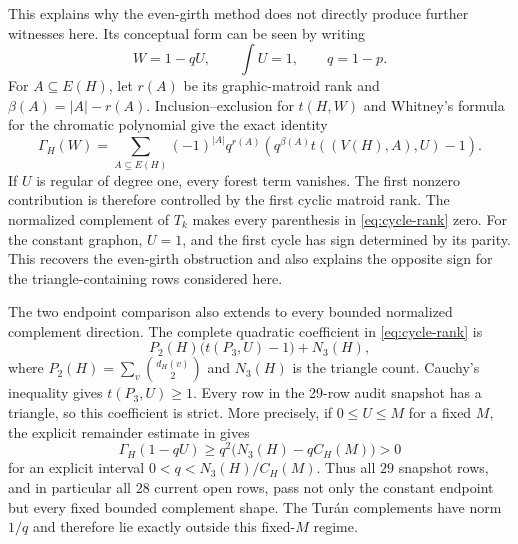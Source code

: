 \documentclass[11pt]{article}
\begin{document}
This explains why the even-girth method does not directly produce further
witnesses here.  Its conceptual form can be seen by writing
\[
 W=1-qU,
 \qquad
 \int U=1,
 \qquad q=1-p.
\]
For $A\subseteq E(H)$, let $r(A)$ be its graphic-matroid rank and
$\beta(A)=|A|-r(A)$.  Inclusion--exclusion for $t(H,W)$ and Whitney's
formula for the chromatic polynomial give the exact identity
\begin{equation}
 \Gamma_H(W)
 =\sum_{A\subseteq E(H)}(-1)^{|A|}q^{r(A)}
 \left(q^{\beta(A)}t((V(H),A),U)-1\right).
 \label{eq:cycle-rank}
\end{equation}
If $U$ is regular of degree one, every forest term vanishes.  The first
nonzero contribution is therefore controlled by the first cyclic matroid
rank.  The normalized complement of $T_k$ makes every parenthesis in
\eqref{eq:cycle-rank} zero.  For the constant graphon, $U=1$, and the first
cycle has sign determined by its parity.  This recovers the even-girth
obstruction and also explains the opposite sign for the triangle-containing
rows considered here.

The two endpoint comparison also extends to every bounded normalized
complement direction.  The complete quadratic coefficient in
\eqref{eq:cycle-rank} is
\[
 P_2(H)\bigl(t(P_3,U)-1\bigr)+N_3(H),
\]
where $P_2(H)=\sum_v\binom{d_H(v)}2$ and $N_3(H)$ is the triangle count.
Cauchy's inequality gives $t(P_3,U)\geq1$.  Every row in the 29-row audit
snapshot has a
triangle, so this coefficient is strict.  More precisely, if $0\leq U\leq
M$ for a fixed $M$, the explicit remainder estimate in
 gives
\[
 \Gamma_H(1-qU)\geq q^2\bigl(N_3(H)-qC_H(M)\bigr)>0
\]
for an explicit interval $0<q<N_3(H)/C_H(M)$.  Thus all $29$ snapshot rows,
and in particular all $28$ current open rows, pass not only the constant
endpoint but every fixed bounded complement shape.  The Tur\'an complements
have norm $1/q$ and therefore lie exactly
outside this fixed-$M$ regime.
\end{document}

